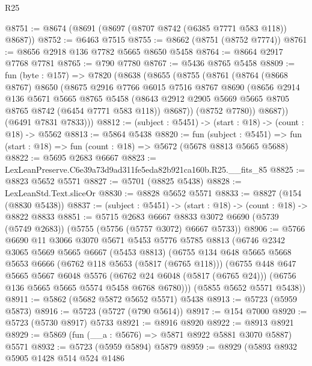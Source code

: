 \begin{lexlean}{R25}
\begin{coremodule}
@8751 := @8674 (@8691 (@8697 (@8707 @8742 (@6385 @7771 @583 @118)) @8687))
@8752 := @6463 @7515
@8755 := @8662 (@8751 (@8752 @7774))
@8761 := @8656 @2918 @136 @7782 @5665 @8650 @5458
@8764 := @8664 @2917 @7768 @7781
@8765 := @790 @7780
@8767 := @5436 @8765 @5458
@8809 := fun (byte : @157) =>
  @7820
    (@8638
      (@8655
        (@8755
          (@8761
            (@8764
              (@8668 @8767)
              @8650
              (@8675
                @2916
                @7766
                @6015
                @7516
                @8767
                @8690
                (@8656
                  @2914
                  @136
                  @5671
                  @5665
                  @8765
                  @5458
                  (@8643 @2912 @2905 @5669 @5665 @8705 @8765 @8742 (@6454 @7771 @583 @118))
                  @8687))
              (@8752 @7780))
            @8687))
        (@6491 @7831 @7833)))
@8812 := (subject : @5451) -> (start : @18) -> (count : @18) -> @5562
@8813 := @5864 @5438
@8820 := fun (subject : @5451) =>
  fun (start : @18) => fun (count : @18) => @5672 (@5678 @8813 @5665 @5688)
@8822 := @5695 @2683 @6667
@8823 := LexLeanPreserve.C6e39a73d9ad311fe5eda82b921ca160b.R25.__fits_85
@8825 := @8823 @5652 @5571
@8827 := @5701 (@8825 @5438)
@8828 := LexLeanStd.Text.sliceOr
@8830 := @8828 @5652 @5571
@8833 := @8827 (@154 (@8830 @5438))
@8837 := (subject : @5451) -> (start : @18) -> (count : @18) -> @8822 @8833
@8851 := @5715
    @2683
    @6667
    @8833
    @3072
    @6690
    (@5739 (@5749 @2683))
    (@5755 (@5756 (@5757 @3072) @6667 @5733))
@8906 := @5766
    @6690
    @11
    @3066
    @3070
    @5671
    @5453
    @5776
    @5785
    @8813
    (@6746
      @2342
      @3065
      @5669
      @5665
      @6667
      (@5453 @8813)
      (@6755
        @134
        @648
        @5665
        @5668
        @5653
        @6666
        (@6762 @118 @5653 (@5817 (@6765 @118)))
        (@6755
          @448
          @647
          @5665
          @5667
          @6048
          @5576
          (@6762 @24 @6048 (@5817 (@6765 @24)))
          (@6756 @136 @5665 @5665 @5574 @5458 @6768 @6780)))
      (@5855 @5652 @5571 @5438))
@8911 := @5862 (@5682 @5872 @5652 @5571) @5438
@8913 := @5723 (@5959 @5873)
@8916 := @5723 (@5727 (@790 @5614))
@8917 := @154 @7000
@8920 := @5723 (@5730 @8917) @5733
@8921 := @8916 @8920
@8922 := @8913 @8921
@8929 := @5869 (fun (__a : @5676) => @5871 @8922 @5881 @3070 @5887) @5571
@8932 := @5723 (@5959 @5894) @5879
@8959 := @8929
    (@5893
      @8932
      @5905
      @1428
      @514
      @524
      @1486

\end{coremodule}
\end{lexlean}
